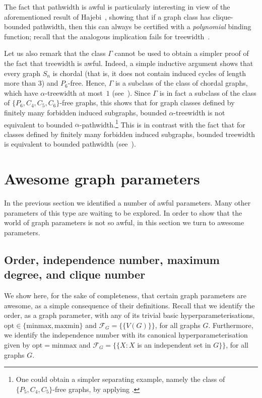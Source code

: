 \documentclass[11pt]{article}
\newcommand{\minmax}{\mathrm{minmax}}
\newcommand{\maxmin}{\mathrm{maxmin}}
\newcommand{\opt}{\mathrm{opt}}
\theoremstyle{plain}
\theoremstyle{definition}
\theoremstyle{remark}
\numberwithin{equation}{section}
\begin{document}
The fact that pathwidth is awful is particularly interesting in view of the aforementioned result of Hajebi~\cite{hajebi2025polynomialboundspathwidth}, showing that if a graph class has clique-bounded pathwidth, then this can always be certified with a \textsl{polynomial} binding function; recall that the analogous implication fails for treewidth~\cite{CT24}.

Let us also remark that the class $\Gamma$ cannot be used to obtain a simpler proof of the fact that treewidth is awful.
Indeed, a simple inductive argument shows that every graph $S_n$ is chordal (that is, it does not contain induced cycles of length more than $3$) and $P_6$-free.
Hence, $\Gamma$ is a subclass of the class of chordal graphs, which have $\alpha$-treewidth at most~$1$ (see~\cite{dallard2022firstpaper}).
Since $\Gamma$ is in fact a subclass of the class of $\{P_6,C_4,C_5,C_6\}$-free graphs, this shows that for graph classes defined by finitely many forbidden induced subgraphs, bounded $\alpha$-treewidth is not equivalent to bounded $\alpha$-pathwidth.\footnote{One could obtain a simpler separating example, namely the class of $\{P_5,C_4,C_5\}$-free graphs, by applying .}
This is in contrast with the fact that for classes defined by finitely many forbidden induced subgraphs, bounded treewidth is equivalent to bounded pathwidth (see~\cite{MR4385180,MR4596345}).

\section{Awesome graph parameters}\label{sec:awesome}  

In the previous section we identified a number of awful parameters. 
Many other parameters of this type are waiting to be explored. 
In order to show that the world of graph parameters is not so awful, in this section we turn to awesome parameters.

\subsection{Order, independence number, maximum degree, and clique number}    

We show here, for the sake of completeness, that certain graph parameters are awesome, as a simple consequence of their definitions.
Recall that we identify the order, as a graph parameter, with any of its trivial basic hyperparameterisations, $\opt\in \{\minmax,\maxmin\}$ and $\mathcal{F}_G = \big\{\{V(G)\}\big\}$, for all graphs $G$.
Furthermore, we identify the independence number with its canonical hyperparameterisation given by $\opt = \minmax$ and $\mathcal{F}_G = \big\{\{X \colon X$ is an independent set in $G\}\big\}$, for all graphs $G$.
\end{document}
